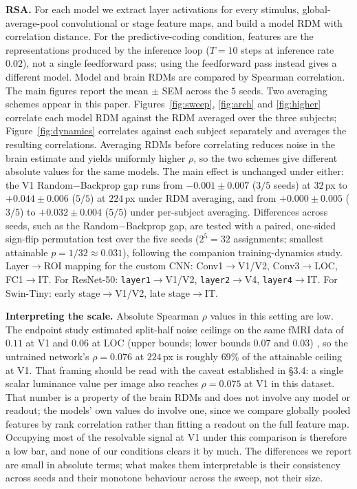\documentclass[10pt,twocolumn]{article}
\begin{document}
\textbf{RSA.} For each model we extract layer activations for every stimulus, global-average-pool convolutional or stage feature maps, and build a model RDM with correlation distance. For the predictive-coding condition, features are the representations produced by the inference loop ($T=10$ steps at inference rate $0.02$), not a single feedforward pass; using the feedforward pass instead gives a different model. Model and brain RDMs are compared by Spearman correlation. The main figures report the mean $\pm$ SEM across the $5$ seeds. Two averaging schemes appear in this paper. Figures~\ref{fig:sweep}, \ref{fig:arch} and \ref{fig:higher} correlate each model RDM against the RDM averaged over the three subjects; Figure~\ref{fig:dynamics} correlates against each subject separately and averages the resulting correlations. Averaging RDMs before correlating reduces noise in the brain estimate and yields uniformly higher $\rho$, so the two schemes give different absolute values for the same models. The main effect is unchanged under either: the V1 Random$-$Backprop gap runs from $-0.001 \pm 0.007$ ($3/5$ seeds) at $32$\,px to $+0.044 \pm 0.006$ ($5/5$) at $224$\,px under RDM averaging, and from $+0.000 \pm 0.005$ ($3/5$) to $+0.032 \pm 0.004$ ($5/5$) under per-subject averaging. Differences across seeds, such as the Random$-$Backprop gap, are tested with a paired, one-sided sign-flip permutation test over the five seeds ($2^5=32$ assignments; smallest attainable $p = 1/32 \approx 0.031$), following the companion training-dynamics study. Layer$\to$ROI mapping for the custom CNN: Conv1$\to$V1/V2, Conv3$\to$LOC, FC1$\to$IT. For ResNet-50: \texttt{layer1}$\to$V1/V2, \texttt{layer2}$\to$V4, \texttt{layer4}$\to$IT. For Swin-Tiny: early stage$\to$V1/V2, late stage$\to$IT.

\textbf{Interpreting the scale.} Absolute Spearman $\rho$ values in this setting are low. The endpoint study estimated split-half noise ceilings on the same fMRI data of $0.11$ at V1 and $0.06$ at LOC (upper bounds; lower bounds $0.07$ and $0.03$) \citep{leutenegger2026}, so the untrained network's $\rho = 0.076$ at $224$\,px is roughly $69\%$ of the attainable ceiling at V1. That framing should be read with the caveat established in \S3.4: a single scalar luminance value per image also reaches $\rho = 0.075$ at V1 in this dataset. That number is a property of the brain RDMs and does not involve any model or readout; the models' own values do involve one, since we compare globally pooled features by rank correlation rather than fitting a readout on the full feature map. Occupying most of the resolvable signal at V1 under this comparison is therefore a low bar, and none of our conditions clears it by much. The differences we report are small in absolute terms; what makes them interpretable is their consistency across seeds and their monotone behaviour across the sweep, not their size.
\end{document}

